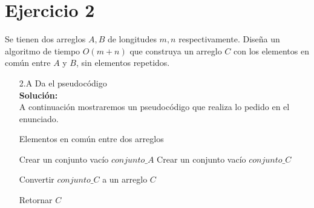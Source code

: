 \documentclass[12pt]{article}
\begin{document}
\section*{Ejercicio 2}
Se tienen dos arreglos $A, B$ de longitudes $m, n$ respectivamente. Diseña un algoritmo de tiempo $O(m + n)$ que construya un arreglo $C$ con los elementos en común entre $A$ y $B$, sin elementos repetidos.
\begin{itemize}
    \item[2.A] Da el pseudocódigo\\
    \textbf{Solución:}\\
    A continuación mostraremos un pseudocódigo que realiza lo pedido en el enunciado.\\
\begin{algorithm}[H]
    \caption{Elementos en común entre dos arreglos}

    Crear un conjunto vacío $conjunto\_A$ 
    Crear un conjunto vacío $conjunto\_C$


    Convertir $conjunto\_C$ a un arreglo $C$

    Retornar $C$
\end{algorithm}



\end{itemize}
\end{document}
